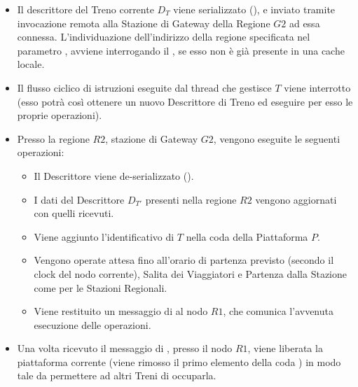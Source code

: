 \begin{itemize}
		\item Il descrittore del Treno corrente $D_T$ viene serializzato (), e inviato tramite invocazione remota alla Stazione di Gateway della Regione $G2$ ad essa connessa. L'individuazione dell'indirizzo della regione specificata nel parametro , avviene interrogando il , se esso non è già presente in una cache locale.
		\item Il flusso ciclico di istruzioni eseguite dal thread che gestisce $T$ viene interrotto (esso potrà così ottenere un nuovo Descrittore di Treno ed eseguire per esso le proprie operazioni).
		\item Presso la regione $R2$, stazione di Gateway $G2$, vengono eseguite le seguenti operazioni:
			\begin{itemize}
				\item Il Descrittore viene de-serializzato ().
				\item I dati del Descrittore $D_{T'}$ presenti nella regione $R2$ vengono aggiornati con quelli ricevuti.
				\item Viene aggiunto l'identificativo di $T$ nella coda  della Piattaforma $P$.
				\item Vengono operate attesa fino all'orario di partenza previsto (secondo il clock del nodo corrente), Salita dei Viaggiatori e Partenza dalla Stazione come per le Stazioni Regionali.
				\item Viene restituito un messaggio di  al nodo $R1$, che comunica l'avvenuta esecuzione delle operazioni.
			\end{itemize}
		\item Una volta ricevuto il messaggio di , presso il nodo $R1$, viene liberata la piattaforma corrente (viene rimosso il primo elemento della coda ) in modo tale da permettere ad altri Treni di occuparla.
	\end{itemize}
	
